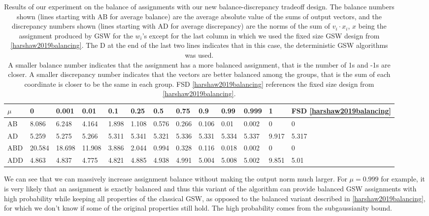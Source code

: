 \documentclass[12pt]{article}
\begin{document}
\begin{center}
\begin{table}[h]
\begin{tabular}{l|llllllllllll}
 $\mu$ &0&0.001&0.01&0.1&0.25&0.5&0.75&0.9&0.99&0.999&1&FSD \ref{harshaw2019balancing}\\
\hline
AB&8.086&6.248&4.164&1.898&1.108&0.576&0.266&0.106&0.01&0.002&0&0 \\
AD&5.259&5.275&5.266&5.311&5.341&5.321&5.336&5.331&5.334&5.337&9.917&5.317\\
ABD&20.584&18.698&11.908&3.886&2.044&0.994&0.328&0.116&0.018&0.002&0&0\\
ADD&4.863&4.837&4.775&4.821&4.885&4.938&4.991&5.004&5.008&5.002&9.851&5.01
\end{tabular}
\caption{Results of our experiment on the balance of assignments with our new balance-discrepancy tradeoff design. The balance numbers shown (lines starting with AB for average balance) are the average absolute value of the sums of output vectors, and the discrepancy numbers shown (lines starting with AD for average discrepancy) are the norms of the sum of $v_i\cdot x_i$, $x$ being the assignment produced by GSW for the $w_i$'s except for the last column in which we used the fixed size GSW design from \ref{harshaw2019balancing}. The D at the end of the last two lines indicates that in this case, the deterministic GSW algorithms was used. \\A smaller balance number indicates that the assignment has a more balanced assignment, that is the number of 1s and -1s are closer. A smaller discrepancy number indicates that the vectors are better balanced among the groups, that is the sum of each coordinate is closer to be the same in each group. FSD \ref{harshaw2019balancing} references the fixed size design from \ref{harshaw2019balancing}.}
\label{balance_tradeoff_results}
\end{table}
\end{center}

We can see that we can massively increase assignment balance without making the output norm much larger. For $\mu=0.999$ for example, it is very likely that an assignment is exactly balanced and thus this variant of the algorithm can provide balanced GSW assignments with high probability while keeping all properties of the classical GSW, as opposed to the balanced variant described in \ref{harshaw2019balancing}, for which we don't know if some of the original properties still hold. The high probability comes from the subgaussianity bound.
\end{document}
